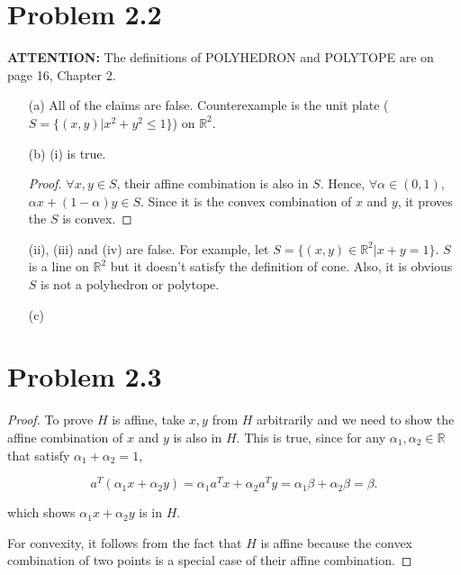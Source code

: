 \documentclass[12pt]{article}
\begin{document}
\section*{Problem 2.2}

\textbf{\color{red}ATTENTION: } The definitions of POLYHEDRON and POLYTOPE are on page 16, Chapter 2.

\begin{enumerate}
\item [(a)]
All of the claims are false. Counterexample is the unit plate ($S = \{(x, y) | x^2 + y^2 \leqslant 1\}$) on $\mathbb{R}^2$.

\item [(b)]
(i) is true. 
\begin{proof}

$\forall x, y \in S$, their affine combination is also in $S$. Hence, $\forall \alpha \in (0, 1)$, $\alpha x + (1-\alpha) y \in S$. Since it is the convex combination of $x$ and $y$, it proves the $S$ is convex.

\end{proof}

(ii), (iii) and (iv) are false. For example, let $S = \{(x, y) \in \mathbb{R}^2 | x + y = 1\}$. $S$ is a line on $\mathbb{R}^2$ but it doesn't satisfy the definition of cone. Also, it is obvious $S$ is not a polyhedron or polytope.

\item[(c)] 



\end{enumerate}


\section*{Problem 2.3}

\begin{proof}

To prove $H$ is affine, take $x, y$ from $H$ arbitrarily and we need to show the affine combination of $x$ and $y$ is also in $H$. This is true, since for any $\alpha_1, \alpha_2 \in \mathbb{R}$ that satisfy $\alpha_1 + \alpha_2  =1$, 

$$
a^T(\alpha_1 x + \alpha_2 y) = \alpha_1 a^T x + \alpha_2 a^T y = \alpha_1\beta + \alpha_2 \beta = \beta.
$$

which shows $\alpha_1 x + \alpha_2 y$ is in $H$.

For convexity, it follows from the fact that $H$ is affine because the convex combination of two points is a special case of their affine combination.

\end{proof}
\end{document}
